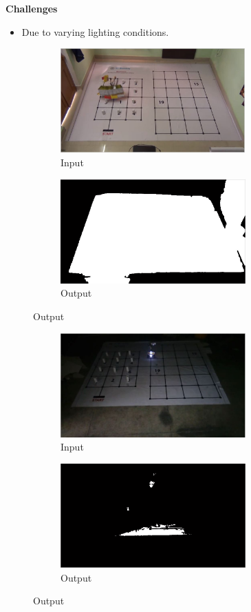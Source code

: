 \documentclass[10pt, a4paper]{beamer}
\begin{document}
\begin{frame}
	\textbf{Challenges}
	\begin{itemize}
		\item {Due to varying lighting conditions.}
	\end{itemize}
	\begin{figure}[h!]
		\begin{subfigure}{0.4\textwidth}
			\includegraphics[width=1\linewidth, height=4cm]{Filtering/challenges/1.jpg}
			\caption{Input}
		\end{subfigure}
		\begin{subfigure}{0.4\textwidth}
			\includegraphics[width=1\linewidth, height=4cm]{Filtering/challenges/11.jpg}
			\caption{Output}
		\end{subfigure}
	\end{figure}	
\end{frame}
\begin{frame}
	\begin{figure}[h!]
		\begin{subfigure}{0.4\textwidth}
			\includegraphics[width=1\linewidth, height=4cm]{Filtering/challenges/3.jpg}
			\caption{Input}
		\end{subfigure}
		\begin{subfigure}{0.4\textwidth}
			\includegraphics[width=1\linewidth, height=4cm]{Filtering/challenges/33.jpg}
			\caption{Output}
		\end{subfigure}
	\end{figure}	
\end{frame}
\end{document}
